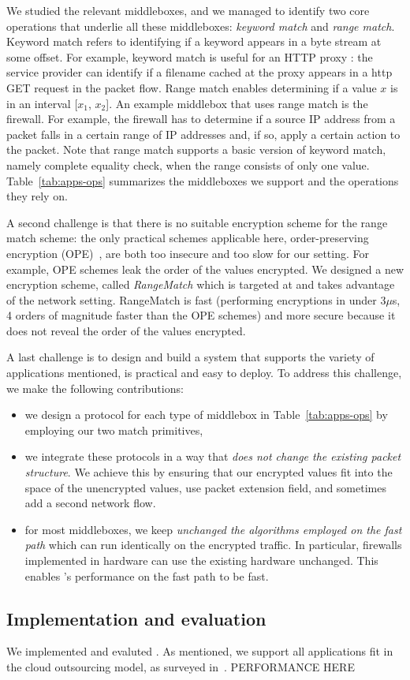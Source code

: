 We studied the relevant middleboxes, and we managed to identify two core operations that underlie all these middleboxes: {\em keyword match} and {\em range match}. Keyword match refers to  identifying if a keyword appears in a byte stream at some offset.   For example, keyword match is useful for an HTTP proxy : the service provider can identify if a filename cached at the proxy appears in a http GET request in the packet flow. %
Range match enables determining if a value $x$ is in an interval [$x_1$, $x_2$]. An example middlebox that uses range match is the firewall.   For example, the firewall has to determine if a source IP address from a packet falls in a certain range of IP addresses and, if so, apply a certain action to the packet.  Note that range match supports a basic version of keyword match, namely complete equality check, when the range consists of only one value.
%
Table~\ref{tab:apps-ops} summarizes the middleboxes we support and the operations they rely on. 


A second challenge is that there is no suitable encryption scheme for the range match scheme:
 the only practical schemes applicable here, order-preserving encryption (OPE)~\cite{boldyreva:ope,popa:mope}, are both too insecure and too slow for our setting.  For example, OPE schemes leak the order of the values encrypted. We designed a new encryption scheme, called {\em RangeMatch} which is targeted at and takes advantage of the network setting. RangeMatch  is fast (performing encryptions in under 3$\mu$s, 4 orders of magnitude faster than the OPE schemes) and more secure because it does not reveal the order of the values encrypted. 
 
A last challenge is to design and build a system that supports the variety of applications mentioned, is practical and easy to deploy. 
To address this challenge, we make the following contributions:
\begin{itemize}
\item we design a  protocol for each type of middlebox in Table~\ref{tab:apps-ops} by employing our two match  primitives,
\item  we integrate these protocols in a way that {\em does not change the existing packet structure}. We achieve this by ensuring that our encrypted values fit into the space of the unencrypted values, use packet extension field, and sometimes add a second network flow.
\item  for most middleboxes, we keep {\em unchanged  the algorithms employed on the fast path} which can run identically on the encrypted traffic. In particular, firewalls implemented in hardware can use the existing hardware unchanged.  This enables \sys's performance on the fast path to be fast. 
\end{itemize}


\subsection{Implementation and evaluation}

We implemented and evaluted \sys. As mentioned, we support all applications fit in the cloud outsourcing model, as surveyed in~\cite{aplomb}. PERFORMANCE HERE
